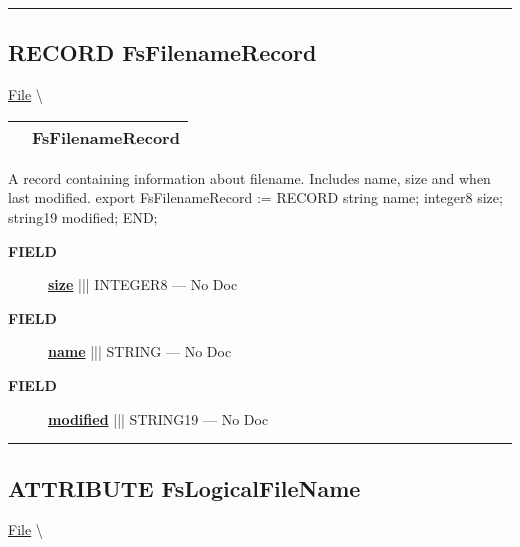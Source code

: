 \rule{\linewidth}{0.5pt}

\subsection*{\textsf{\colorbox{headtoc}{\color{white} RECORD}
FsFilenameRecord}}

\hypertarget{ecldoc:file.fsfilenamerecord}{}
\hspace{0pt} \hyperlink{ecldoc:File}{File} \textbackslash 

{\renewcommand{\arraystretch}{1.5}
\begin{tabularx}{\textwidth}{|>{\raggedright\arraybackslash}l|X|}
\hline
\hspace{0pt}\mytexttt{\color{red} } & \textbf{FsFilenameRecord} \\
\hline
\end{tabularx}
}

\par





A record containing information about filename. Includes name, size and when last modified. export FsFilenameRecord := RECORD string name; integer8 size; string19 modified; END;







\par
\begin{description}
\item [\colorbox{tagtype}{\color{white} \textbf{\textsf{FIELD}}}] \textbf{\underline{size}} ||| INTEGER8 --- No Doc
\item [\colorbox{tagtype}{\color{white} \textbf{\textsf{FIELD}}}] \textbf{\underline{name}} ||| STRING --- No Doc
\item [\colorbox{tagtype}{\color{white} \textbf{\textsf{FIELD}}}] \textbf{\underline{modified}} ||| STRING19 --- No Doc
\end{description}





\rule{\linewidth}{0.5pt}
\subsection*{\textsf{\colorbox{headtoc}{\color{white} ATTRIBUTE}
FsLogicalFileName}}

\hypertarget{ecldoc:file.fslogicalfilename}{}
\hspace{0pt} \hyperlink{ecldoc:File}{File} \textbackslash 

